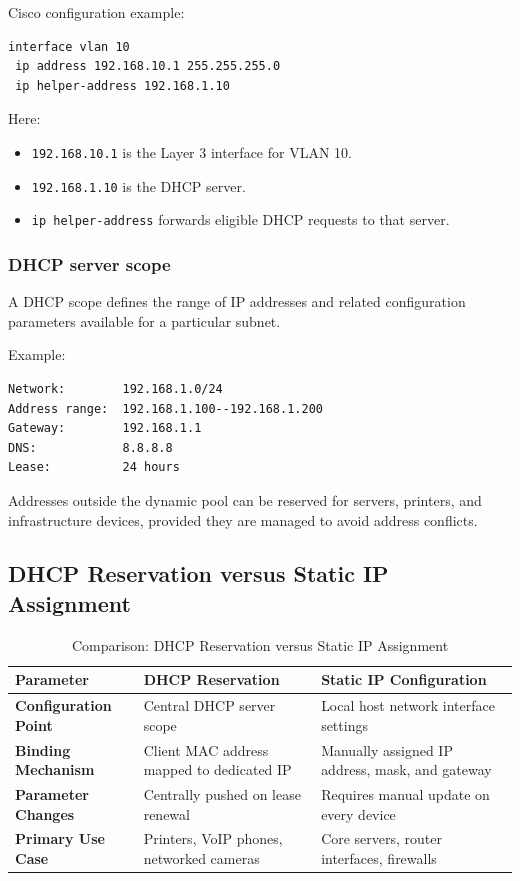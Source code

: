 Cisco configuration example:

\begin{lstlisting}
interface vlan 10
 ip address 192.168.10.1 255.255.255.0
 ip helper-address 192.168.1.10
\end{lstlisting}

Here:

\begin{itemize}
\item \texttt{192.168.10.1} is the Layer 3 interface for VLAN 10.
\item \texttt{192.168.1.10} is the DHCP server.
\item \texttt{ip helper-address} forwards eligible DHCP requests to that server.
\end{itemize}

\subsubsection{DHCP server scope}

A DHCP scope defines the range of IP addresses and related configuration parameters available for a particular subnet.

Example:

\begin{lstlisting}
Network:        192.168.1.0/24
Address range:  192.168.1.100--192.168.1.200
Gateway:        192.168.1.1
DNS:            8.8.8.8
Lease:          24 hours
\end{lstlisting}

Addresses outside the dynamic pool can be reserved for servers, printers, and infrastructure devices, provided they are managed to avoid address conflicts.

\subsection{DHCP Reservation versus Static IP Assignment}
\begin{table}[htbp]
\centering
\caption{Comparison: DHCP Reservation versus Static IP Assignment}
\label{tab:dhcp_res_vs_static}
\begin{tabularx}{\textwidth}{p{3.5cm} X X}
\toprule
\textbf{Parameter} & \textbf{DHCP Reservation} & \textbf{Static IP Configuration} \\
\midrule
\textbf{Configuration Point} & Central DHCP server scope & Local host network interface settings \\
\textbf{Binding Mechanism} & Client MAC address mapped to dedicated IP & Manually assigned IP address, mask, and gateway \\
\textbf{Parameter Changes} & Centrally pushed on lease renewal & Requires manual update on every device \\
\textbf{Primary Use Case} & Printers, VoIP phones, networked cameras & Core servers, router interfaces, firewalls \\
\bottomrule
\end{tabularx}
\end{table}


